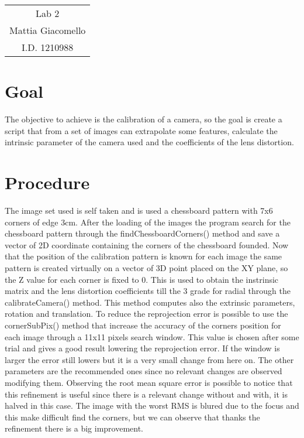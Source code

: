\documentclass[11pt,a4paper]{article}
\newcommand{\cc}{\fontfamily{txtt}\selectfont}
\begin{document}
\begin{center}
\begin{tabular}{c}
\LARGE{Lab 2}\\
\large{Mattia Giacomello}\\
I.D. 1210988
\end{tabular}
\end{center}

\section{Goal}
The objective to achieve is the calibration of a camera, so the goal is create a script that from a set of images can extrapolate some features, calculate the intrinsic parameter of the camera used and the coefficients of the lens distortion.

\section{Procedure}
The image set used is self taken and is used a chessboard pattern with 7x6 corners of edge 3cm.\newline
After the loading of the images the program search for the chessboard pattern through the {\cc findChessboardCorners()} method and save a {\cc vector} of 2D coordinate containing the corners of the chessboard founded.
Now that the position of the calibration pattern is known for each image the same pattern is created virtually on a {\cc vector} of 3D point placed on the XY plane, so the Z value for each corner is fixed to $0$.
This is used to obtain the instrinsic matrix and the lens distortion coefficients till the 3 grade for radial through the {\cc calibrateCamera()} method.
This method computes also the extrinsic parameters, rotation and translation.\newline
To reduce the reprojection error is possible to use the {\cc cornerSubPix()} method that increase the accuracy of the corners position for each image through a 11x11 pixels search window. 
This value is chosen after some trial and gives a good result lowering the reprojection error.
If the window is larger the error still lowers but it is a very small change from here on.
The other parameters are the recommended ones since no relevant changes are observed modifying them.\newline
Observing the root mean square error is possible to notice that this refinement is useful since there is a relevant change without and with, it is halved in this case.
The image with the worst RMS is blured due to the focus and this make difficult find the corners, but we can observe that thanks the refinement there is a big improvement.
\end{document}
